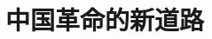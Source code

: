 \documentclass[10pt, UTF8]{ctexbook} %
\begin{document}





\chapter{中国革命的新道路}
\thispagestyle{empty}



\end{document}

